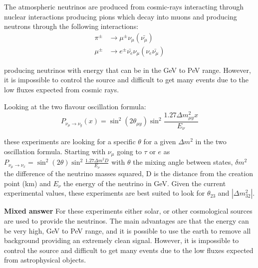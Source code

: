 The atmospheric neutrinos are produced from cosmic-rays interacting through nuclear interactions producing pions which decay into muons and producing neutrons through the following interactions:
\begin{align}
\pi^{\pm} &\rightarrow \mu^{\pm}  \nu_\mu (\bar{\nu_\mu}) \\
\mu^{\pm} &\rightarrow e^{\pm} \bar{\nu_e}  \nu_\mu  (\nu_e \bar{\nu_\mu})
\end{align}

producing neutrinos with energy that can be in the GeV to PeV range. However, it is impossible to control the source and difficult to get many events due to the low fluxes expected from cosmic rays. 

Looking at the two flavour oscillation formula:
\begin{equation}
P_{\nu_\mu \rightarrow \nu_y} (x) = \sin^2(2\theta_{\mu y})\sin^2 \frac{1.27\Delta m_{\mu y}^2 x}{E_\nu}
\end{equation}

these experiments are looking for a specific $\theta$ for a given $\Delta m^2$ in the two oscillation formula.  Starting with $\nu_\mu$ going to $\tau$ or $e$ as $P_{\nu_\mu \rightarrow \nu_x} = \sin^2(2\theta)\sin^2 \frac{1.27\Delta m^2 D}{E_\nu}$ with $\theta$ the mixing angle between states, $\delta m^2$ the difference of the neutrino masses squared, D is the distance from the creation point (km) and $E_\nu$  the energy of the neutrino in GeV. Given the current experimental values, these experiments are best suited to look for $\theta_23$ and $|\Delta m_{32}^2 |$.


\textbf{Mixed answer}
For these experiments either solar, or other cosmological sources are used to provide the neutrinos. The main advantages are that the energy can be very high, GeV to PeV range, and it is possible to use the earth to remove all background providing an extremely clean signal. However, it is impossible to control the source and difficult to get many events due to the low fluxes expected from astrophysical objects. 
\fi




